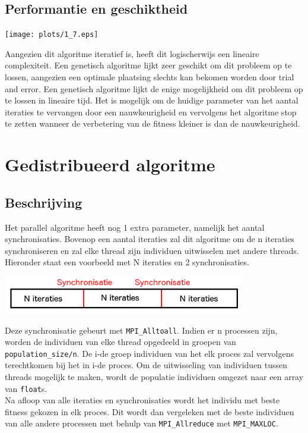 \documentclass[]{article}
\begin{document}
\subsection{Performantie en geschiktheid}
\begin{center}\texttt{[image: plots/1\_7.eps]}\end{center}
Aangezien dit algoritme iteratief is, heeft dit logischerwijs een lineaire complexiteit. Een genetisch algoritme lijkt zeer geschikt om dit probleem op te lossen,
aangezien een optimale plaatsing slechts kan bekomen worden door trial and error. Een genetisch algoritme lijkt de enige mogelijkheid om dit probleem op te lossen
in lineaire tijd. Het is mogelijk om de huidige parameter van het aantal iteraties te vervangen
door een nauwkeurigheid en vervolgens het algoritme stop te zetten wanneer de verbetering van de fitness kleiner is dan de nauwkeurigheid.

\section{Gedistribueerd algoritme}
\subsection{Beschrijving}
Het parallel algoritme heeft nog 1 extra parameter, namelijk het aantal synchronisaties.
Bovenop een aantal iteraties zal dit algoritme om de n iteraties synchroniseren en zal elke thread zijn individuen uitwisselen met
andere threads.  Hieronder staat een voorbeeld met N iteraties en 2 synchronisaties.
\begin{center}\includegraphics[width=400px]{synchs.png}\end{center}
Deze synchronisatie gebeurt met \texttt{MPI\_Alltoall}. Indien er n processen zijn, worden de individuen van elke thread opgedeeld in groepen van
\texttt{population\_size/n}. De i-de groep individuen van het elk proces zal vervolgens terechtkomen bij het in i-de proces.
Om de uitwisseling van individuen tussen threads mogelijk te maken, wordt de populatie individuen omgezet naar een array van \texttt{float}s.\\
Na afloop van alle iteraties en synchronisaties wordt het individu met beste fitness gekozen in elk proces. Dit wordt dan vergeleken met de
beste individuen van alle andere processen met behulp van \texttt{MPI\_Allreduce} met \texttt{MPI\_MAXLOC}.
\end{document}
